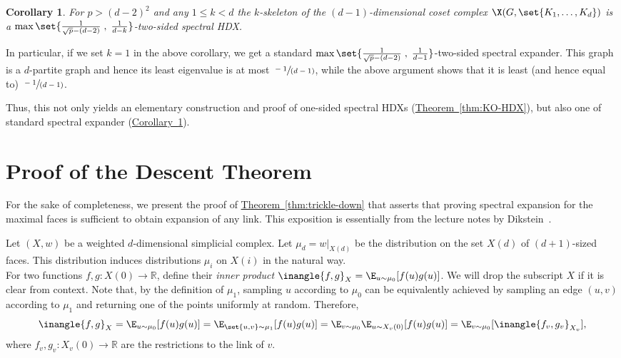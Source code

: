 \documentclass[11pt]{article}
\newcommand{\expref}[2]{\texorpdfstring{\hyperref[#2]{#1~\ref{#2}}}{#1~\ref{#2}}}
\newtheorem{corollary}[theorem]{Corollary}
\newcommand{\R}{{\mathbb R}}
\begin{document}
\begin{corollary}\label{cor:KO-exp} For $p > (d-2)^2$ and any $1 \leq
  k < d$
  the $k$-skeleton of the $(d-1)$-dimensional coset complex $\X(G,\set{K_1,\ldots,K_d})$
is a $\max\set{\frac1{\sqrt{p}-(d-2)}\;,\;\frac{1}{d-k}}$-two-sided spectral HDX.
  \end{corollary}

  In particular, if we set $k=1$ in the above corollary, we get a
  standard
  $\max\set{\frac1{\sqrt{p}-(d-2)}\;,\;\frac{1}{d-1}}$-two-sided spectral expander.  This graph is a $d$-partite graph and hence its
  least eigenvalue is at most $\sfrac{-1}{(d-1)}$, while the above
  argument shows that it is least (and hence equal to)
  $\sfrac{-1}{(d-1)}$. 

 Thus, this not only yields an elementary construction and proof of
  one-sided spectral HDXs (\expref{Theorem}{thm:KO-HDX}), but also one of
  standard spectral expander (\expref{Corollary}{cor:KO-exp}).
  
  


\appendix


\section{Proof of the Descent Theorem}\label{sec:descent}

For the sake of completeness, we present the proof of
\expref{Theorem}{thm:trickle-down} that asserts that proving spectral expansion
for the maximal faces is sufficient to obtain expansion of any
link. This exposition is essentially from the lecture notes by 
Dikstein~\cite{Dikstein2019}. 

Let $(X,w)$ be a weighted $d$-dimensional simplicial complex. Let
$\mu_{d}=w|_{X(d)}$ be the distribution on the set $X(d)$ of
$(d+1)$-sized faces. This distribution induces distributions $\mu_i$ on
$X(i)$ in the natural way.\\ 

For two functions $f,g\colon X(0) \rightarrow \R$, define their \emph{inner product}
$\inangle{f,g}_X = \E_{u \sim \mu_0} [f(u) g(u)]$. We will drop the
subscript $X$ if it is clear from context. Note that, by the
definition of $\mu_1$, sampling $u$ according to $\mu_0$  can be
equivalently achieved  by sampling an edge $(u,v)$ according to $\mu_1$ and returning one of the points uniformly at random. Therefore,
\begin{equation}\label{eqn-innerprod1}
  \inangle{f,g}_X = \E_{u \sim \mu_0}[f(u) g(u)] = \E_{\set{u,v} \sim
    \mu_1}[f(u)g(u)] =\E_{v \sim \mu_0} \E_{u \sim X_v(0)}[f(u) g(u)] =\E_{v \sim \mu_0}[\inangle{f_v,g_v}_{X_v}],
\end{equation}
where $f_v,g_v\colon X_v(0) \rightarrow \R$ are the restrictions to the link of $v$. 
\end{document}
